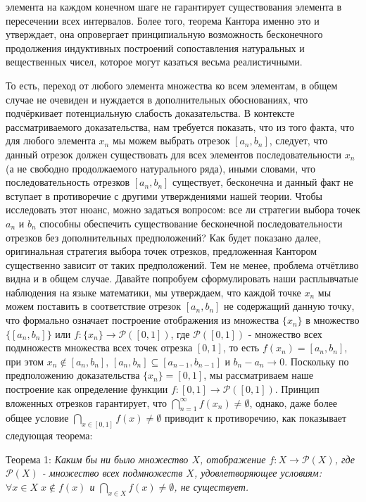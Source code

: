 \documentclass[12pt]{article}
\begin{document}
элемента на каждом конечном шаге не гарантирует существования элемента в пересечении всех интервалов. Более того, теорема Кантора именно это и утверждает, она опровергает принципиальную возможность бесконечного продолжения индуктивных построений сопоставления натуральных и вещественных чисел, которое могут казаться весьма реалистичными.

То есть, переход от любого элемента множества ко всем элементам, в общем случае не очевиден и нуждается в дополнительных обоснованиях, что подчёркивает потенциальную слабость доказательства. В контексте рассматриваемого доказательства, нам требуется показать, что из того факта, что для любого элемента $x_n$ мы можем выбрать отрезок $[a_n, b_n]$, следует, что данный отрезок должен существовать для всех элементов последовательности $x_n$ (а не свободно продолжаемого натурального ряда), иными словами, что последовательность отрезков $[a_n, b_n]$ существует, бесконечна и данный факт не вступает в противоречие с другими утверждениями нашей теории. Чтобы исследовать этот нюанс, можно задаться вопросом: все ли стратегии выбора точек $a_n$ и $b_n$ способны обеспечить существование бесконечной последовательности отрезков без дополнительных предположений? Как будет показано далее, оригинальная стратегия выбора точек отрезков, предложенная Кантором существенно зависит от таких предположений. Тем не менее, проблема отчётливо видна и в общем случае. Давайте попробуем сформулировать наши расплывчатые наблюдения на языке математики, мы утверждаем, что каждой точке $x_n$ мы можем поставить в соответствие отрезок $[a_n, b_n]$ не содержащий данную точку, что формально означает построение отображения из множества $\{ x_n \}$ в множество $\{ [ a_n, b_n ] \}$ или $f : \{ x_n \} \to \mathcal{P}([0, 1])$, где $\mathcal{P}([0, 1])$ - множество всех подмножеств множества всех точек отрезка $[0, 1]$, то есть $f(x_n) = [a_n, b_n]$, при этом $x_n \notin [a_n, b_n]$, $[a_n, b_n] \subseteq [a_{n - 1}, b_{n - 1}]$ и $b_n - a_n \to 0$. Поскольку по предположению доказательства $\{ x_n \} = [0, 1]$, мы рассматриваем наше построение как определение функции $f : [0, 1] \to \mathcal{P}([0, 1])$. Принцип вложенных отрезков гарантирует, что $\bigcap\limits_{n = 1}^{\infty} f(x_n) \neq \emptyset$, однако, даже более общее условие $\bigcap\limits_{x \in [0, 1]} f(x) \neq \emptyset$ приводит к противоречию, как показывает следующая теорема:

Теорема 1: {\sl Каким бы ни было множество $X$, отображение $f : X \to \mathcal{P}(X)$, где $\mathcal{P}(X)$ - множество всех подмножеств $X$, удовлетворяющее условиям: $\forall x \in X \; x \notin f(x)$ и $\bigcap\limits_{x \in X} f(x) \neq \emptyset$, не существует.}
\end{document}
